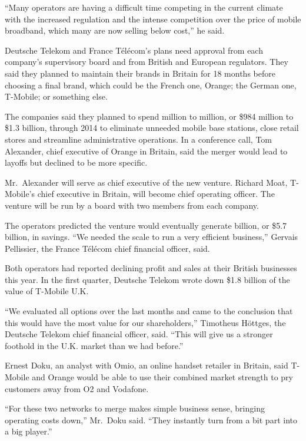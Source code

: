 ﻿\documentclass[12pt]{article}
\begin{document}
``Many operators are having a difficult time competing in the current climate with the increased
regulation and the intense competition over the price of mobile broadband, which many are now
selling below cost,'' he said.

Deutsche Telekom and France T\'el\'ecom's plans need approval from each company's supervisory board
and from British and European regulators. They said they planned to maintain their brands in Britain
for 18 months before choosing a final brand, which could be the French one, Orange; the German one,
T-Mobile; or something else.

The companies said they planned to spend  million to  million, or
\$984 million to \$1.3 billion, through 2014 to eliminate unneeded mobile base stations, close
retail stores and streamline administrative operations. In a conference call, Tom Alexander, chief
executive of Orange in Britain, said the merger would lead to layoffs but declined to be more
specific.

Mr.~Alexander will serve as chief executive of the new venture. Richard Moat, T-Mobile's chief
executive in Britain, will become chief operating officer. The venture will be run by a board with
two members from each company.

The operators predicted the venture would eventually generate  billion, or \$5.7 billion,
in savings. ``We needed the scale to run a very efficient business,'' Gervais Pellissier, the France
T\'el\'ecom chief financial officer, said.

Both operators had reported declining profit and sales at their British businesses this year. In the
first quarter, Deutsche Telekom wrote down \$1.8 billion of the value of T-Mobile U.K.

``We evaluated all options over the last months and came to the conclusion that this would have the
most value for our shareholders,'' Timotheus Höttges, the Deutsche Telekom chief financial officer,
said. ``This will give us a stronger foothold in the U.K. market than we had before.''

Ernest Doku, an analyst with Omio, an online handset retailer in Britain, said T-Mobile and Orange
would be able to use their combined market strength to pry customers away from O2 and Vodafone.

``For these two networks to merge makes simple business sense, bringing operating costs down,''
Mr.~Doku said. ``They instantly turn from a bit part into a big player.''
\end{document}
